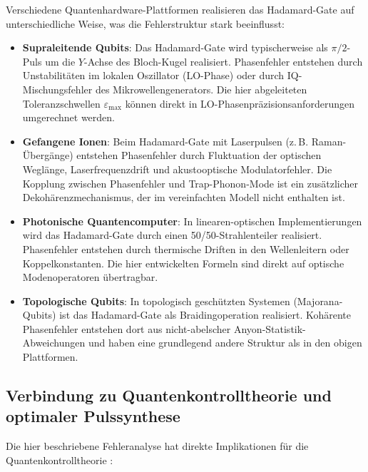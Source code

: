 ﻿\documentclass[11pt,a4paper]{article}
\theoremstyle{definition}
\newcommand{\eps}{\varepsilon}
\begin{document}
Verschiedene Quantenhardware-Plattformen realisieren das Hadamard-Gate
auf unterschiedliche Weise, was die Fehlerstruktur stark beeinflusst:

\begin{itemize}
  \item \textbf{Supraleitende Qubits}: Das Hadamard-Gate wird typischerweise
        als $\pi/2$-Puls um die $Y$-Achse des Bloch-Kugel realisiert.
        Phasenfehler entstehen durch Unstabilitäten im lokalen Oszillator
        (LO-Phase) oder durch IQ-Mischungsfehler des Mikrowellengenerators.
        Die hier abgeleiteten Toleranzschwellen $\eps_{\max}$ können direkt
        in LO-Phasenpräzisionsanforderungen umgerechnet werden.

  \item \textbf{Gefangene Ionen}: Beim Hadamard-Gate mit Laserpulsen
        (z.\,B. Raman-Übergänge) entstehen Phasenfehler durch Fluktuation
        der optischen Weglänge, Laserfrequenzdrift und akustooptische
        Modulatorfehler.  Die Kopplung zwischen Phasenfehler und
        Trap-Phonon-Mode ist ein zusätzlicher Dekohärenzmechanismus,
        der im vereinfachten Modell nicht enthalten ist.

  \item \textbf{Photonische Quantencomputer}: In linearen-optischen
        Implementierungen wird das Hadamard-Gate durch einen
        50/50-Strahlenteiler realisiert.  Phasenfehler entstehen durch
        thermische Driften in den Wellenleitern oder Koppelkonstanten.
        Die hier entwickelten Formeln sind direkt auf optische Modenoperatoren
        übertragbar.

  \item \textbf{Topologische Qubits}: In topologisch geschützten
        Systemen (Majorana-Qubits) ist das Hadamard-Gate als Braidingoperation
        realisiert.  Kohärente Phasenfehler entstehen dort aus
        nicht-abelscher Anyon-Statistik-Abweichungen und haben eine
        grundlegend andere Struktur als in den obigen Plattformen.
\end{itemize}

\subsection{Verbindung zu Quantenkontrolltheorie und optimaler Pulssynthese}
\label{subsec:control}

Die hier beschriebene Fehleranalyse hat direkte Implikationen für die
Quantenkontrolltheorie \cite{D'Alessandro2007}:
\end{document}
